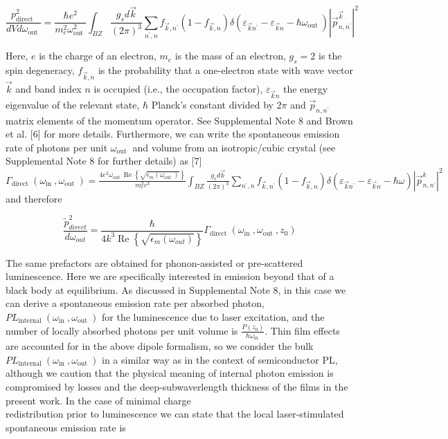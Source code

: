 \documentclass[10pt]{article}
\begin{document}
$$
\frac{p_{\text {direct }}^{2}}{d V d \omega_{\text {out }}}=\frac{\hbar e^{2}}{m_{e}^{2} \omega_{\text {out }}^{2}} \int_{B Z} \frac{g_{s} d \vec{k}}{(2 \pi)^{3}} \sum_{n^{\prime}, n} f_{\vec{k}, n^{\prime}}\left(1-f_{\vec{k}, n}\right) \delta\left(\varepsilon_{\vec{k} n^{\prime}}-\varepsilon_{\vec{k} n}-\hbar \omega_{\text {out }}\right)\left|\vec{p}_{n, n^{\prime}}^{\vec{k}}\right|^{2}
$$

Here, $e$ is the charge of an electron, $m_{e}$ is the mass of an electron, $g_{s}=2$ is the spin degeneracy, $f_{\vec{k}, n}$ is the probability that a one-electron state with wave vector $\vec{k}$ and band index $n$ is occupied (i.e., the occupation factor), $\varepsilon_{\vec{k} n}$ the energy eigenvalue of the relevant state, $\hbar$ Planck's constant divided by $2 \pi$ and $\vec{p}_{n, n^{\prime}}$ matrix elements of the momentum operator. See Supplemental Note 8 and Brown et al. [6] for more details. Furthermore, we can write the spontaneous emission rate of photons per unit $\omega_{\text {out }}$ and volume from an isotropic/cubic crystal (see Supplemental Note 8 for further details) as [7]\\
$\Gamma_{\text {direct }}\left(\omega_{\text {in }}, \omega_{\text {out }}\right)=\frac{4 e^{2} \omega_{\text {out }} \operatorname{Re}\left\{\sqrt{\epsilon_{m}\left(\omega_{\text {out }}\right)}\right\}}{m_{e}^{2} c^{3}} \int_{B Z} \frac{g_{s} d \vec{k}}{(2 \pi)^{3}} \sum_{n^{\prime}, n} f_{\vec{k}, n^{\prime}}\left(1-f_{\vec{k}, n}\right) \delta\left(\varepsilon_{\vec{k} n^{\prime}}-\varepsilon_{\vec{k} n}-\hbar \omega\right)\left|\vec{p}_{n, n^{\prime}}^{k}\right|^{2}$\\
and therefore


\begin{equation*}
\frac{\tilde{p}_{d i r e c t}^{2}}{d \omega_{o u t}}=\frac{\hbar}{4 k^{3} \operatorname{Re}\left\{\sqrt{\epsilon_{m}\left(\omega_{o u t}\right)}\right\}} \Gamma_{\text {direct }}\left(\omega_{\text {in }}, \omega_{\text {out }}, z_{0}\right) \tag{S6}
\end{equation*}


The same prefactors are obtained for phonon-assisted or pre-scattered luminescence. Here we are specifically interested in emission beyond that of a black body at equilibrium. As discussed in Supplemental Note 8, in this case we can derive a spontaneous emission rate per absorbed photon, $P L_{\text {internal }}\left(\omega_{\text {in }}, \omega_{\text {out }}\right)$ for the luminescence due to laser excitation, and the number of locally absorbed photons per unit volume is $\frac{P\left(z_{0}\right)}{\hbar \omega_{\text {in }}}$. Thin film effects are accounted for in the above dipole formalism, so we consider the bulk $P L_{\text {internal }}\left(\omega_{\text {in }}, \omega_{\text {out }}\right)$ in a similar way as in the context of semiconductor PL, although we caution that the physical meaning of internal photon emission is compromised by losses and the deep-subwaverlength thickness of the films in the present work. In the case of minimal charge\\
redistribution prior to luminescence we can state that the local laser-stimulated spontaneous emission rate is
\end{document}
